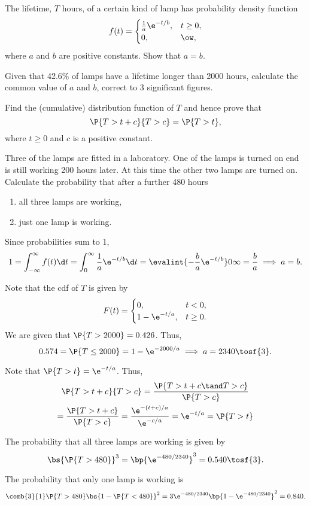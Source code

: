 \begin{problem}
    The lifetime, $T$ hours, of a certain kind of lamp has probability density function \[f(t) = \begin{cases}
        \frac1a \e^{-t/b}, & t \geq 0,\\
        0, & \ow,
    \end{cases}\] where $a$ and $b$ are positive constants. Show that $a = b$.
    
    Given that 42.6\% of lamps have a lifetime longer than 2000 hours, calculate the common value of $a$ and $b$, correct to 3 significant figures.

    Find the (cumulative) distribution function of $T$ and hence prove that \[\P{T > t + c}{T > c} = \P{T > t},\] where $t \geq 0$ and $c$ is a positive constant.
    
    Three of the lamps are fitted in a laboratory. One of the lamps is turned on end is still working 200 hours later. At this time the other two lamps are turned on. Calculate the probability that after a further 480 hours
    \begin{enumerate}
        \item all three lamps are working,
        \item just one lamp is working.
    \end{enumerate}
\end{problem}
\begin{solution}
    Since probabilities sum to 1, \[1 = \int_{-\infty}^\infty f(t) \d t = \int_0^\infty \frac1a \e^{-t/b} \d t = \evalint{-\frac{b}{a} \e^{-t/b}}0\infty = \frac{b}{a} \implies a = b.\]

    Note that the cdf of $T$ is given by \[F(t) = \begin{cases}
        0, & t < 0,\\
        1 - \e^{-t/a}, & t \geq 0.
    \end{cases}\] We are given that $\P{T > 2000} = 0.426$. Thus, \[0.574 = \P{T \leq 2000} = 1 - \e^{-2000/a} \implies a = 2340 \tosf{3}.\]

    Note that $\P{T > t} = \e^{-t/a}$. Thus,
    \begin{gather*}
        \P{T > t + c}{T > c} = \frac{\P{T > t + c \tand T > c}}{\P{T > c}}\\
        = \frac{\P{T > t + c}}{\P{T > c}} = \frac{\e^{-(t + c)/a}}{\e^{-c/a}} = \e^{-t/a} = \P{T > t}
    \end{gather*}

    \begin{ppart}
        The probability that all three lamps are working is given by \[\bs{\P{T > 480}}^3 = \bp{\e^{-480/2340}}^3 = 0.540 \tosf{3}.\]
    \end{ppart}
    \begin{ppart}
        The probability that only one lamp is working is \[\comb{3}{1} \P{T > 480} \bs{1 - \P{T < 480}}^2 = 3 \e^{-480/2340} \bp{1 - \e^{-480/2340}}^2 = 0.840.\]
    \end{ppart}
\end{solution}


